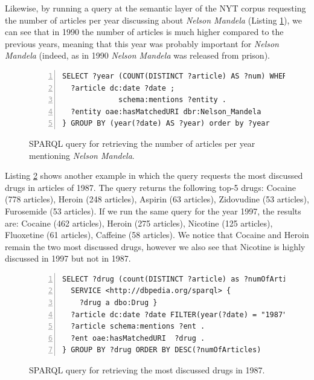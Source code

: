 \documentclass[twocolumn]{svjour3}
\begin{document}
Likewise, by running a query at the semantic layer of the NYT corpus
requesting the number of articles per year discussing
about {\em Nelson Mandela} (Listing \ref{fig:queryExampleInferMand}),
we can see that in 1990 the number of articles is much higher compared
to the previous years, meaning that this year was probably important
for {\em Nelson Mandela} (indeed, as in
1990 {\em Nelson Mandela} was released from prison).

\begin{figure}[th]
\centering \scriptsize
\begin{Verbatim}[frame=lines,numbers=left,numbersep=1pt]
SELECT ?year (COUNT(DISTINCT ?article) AS ?num) WHERE {
  ?article dc:date ?date ;
             schema:mentions ?entity .
  ?entity oae:hasMatchedURI dbr:Nelson_Mandela
} GROUP BY (year(?date) AS ?year) order by ?year
\end{Verbatim}
\vspace{-4mm}
\caption{SPARQL query for retrieving the number of articles per
year mentioning {\em Nelson Mandela}.}
\label{fig:queryExampleInferMand}
\end{figure}

Listing \ref{fig:queryExampleDrugs} shows another example in which
the query requests the most discussed drugs in articles of 1987.
The query returns the following top-5 drugs:
Cocaine (778 articles),
Heroin (248 articles),
Aspirin (63 articles),
Zidovudine (53 articles),
Furosemide (53 articles).
If we run the same query for the year 1997, the results are:
Cocaine (462 articles),
Heroin (275 articles),
Nicotine (125 articles),
Fluoxetine (61 articles),
Caffeine (58 articles).
We notice that Cocaine and Heroin remain the two most discussed drugs,
however we also see that Nicotine is highly discussed in 1997 but not in 1987.

\begin{figure}[th]
\centering \scriptsize
\begin{Verbatim}[frame=lines,numbers=left,numbersep=1pt]
SELECT ?drug (count(DISTINCT ?article) as ?numOfArticles) WHERE {
  SERVICE <http://dbpedia.org/sparql> {
    ?drug a dbo:Drug }
  ?article dc:date ?date FILTER(year(?date) = "1987") .
  ?article schema:mentions ?ent .
  ?ent oae:hasMatchedURI  ?drug .
} GROUP BY ?drug ORDER BY DESC(?numOfArticles)
\end{Verbatim}
\vspace{-4mm}
\caption{SPARQL query for retrieving the most discussed drugs in 1987.}
\label{fig:queryExampleDrugs}
\end{figure}
\end{document}
